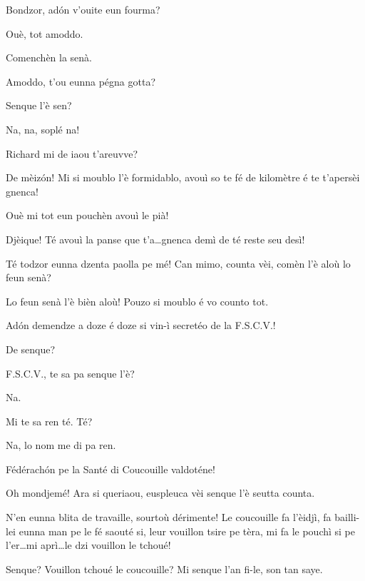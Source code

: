 \begin{drama}
\Richardspeaks{} Bondzor, ad\'on v'ouite eun fourma?

\Tuenospeaks Ouè, tot amoddo.

\Richardspeaks Comenchèn la senà.

\Gerominespeaks Amoddo,  t'ou eunna pégna gotta?

\Richardspeaks Senque l'è sen?


\Richardspeaks Na, na, soplé na!

\Tuenospeaks{} Richard mi de iaou t'areuvve? 

\Richardspeaks De mèiz\'on! Mi si moublo l'è formidablo, avouì so te fé de kilomètre é te t'apersèi gnenca! 

\Tuenospeaks Ouè mi tot eun pouchèn avouì le pià!

\Richardspeaks Djèique! Té avouì la panse que t'a\ldots  gnenca demì de té reste seu desì!

\Tuenospeaks{} Té todzor eunna dzenta paolla pe mé! Can mimo, counta vèi, comèn l'è aloù lo feun senà?

\Richardspeaks Lo feun senà l'è bièn aloù! Pouzo si moublo é vo counto tot.


\Richardspeaks Ad\'on demendze a doze é doze si vin-ì secretéo de la F.S.C.V.!

\Tcheuttespeaks De senque?

\Richardspeaks{} F.S.C.V., te sa pa senque l'è?

\Tuenospeaks Na.

\Richardspeaks Mi te sa ren té. Té?

\Gerominespeaks Na, lo nom me di pa ren.

\Richardspeaks Fédérach\'on pe la Santé di Coucouille valdoténe!

\Tuenospeaks Oh mondjemé! Ara si queriaou, euspleuca vèi senque l'è seutta counta.

\Richardspeaks N'en eunna blita de travaille, sourtoù dérimente! Le coucouille fa l'èidjì, fa bailli-lei eunna man pe le fé saouté si, leur  vouillon tsire pe tèra, mi fa le pouchì si pe l'er\ldots mi aprì\ldots le dzi vouillon le tchoué!

\Gerominespeaks Senque? Vouillon tchoué le coucouille? Mi senque l'an fi-le, son tan saye.


\end{drama}
